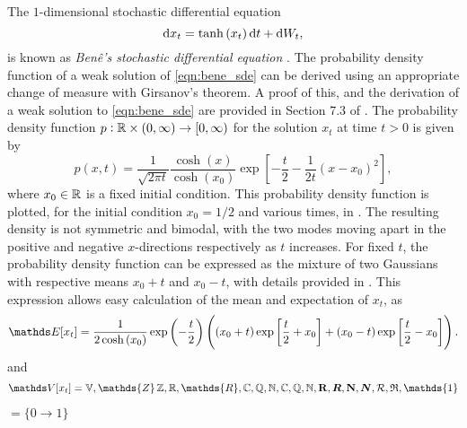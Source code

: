 \begin{example}
	The \(1\)-dimensional stochastic differential equation 
	\begin{equation}
		\sde{x_t}{\tanh\left(x_t\right)}{},
		\label{eqn:bene_sde}
	\end{equation}
	is known as \emph{Ben\^e's stochastic differential equation} \cite{SarkkaSolin_2019_AppliedStochasticDifferential}.
	The probability density function of a weak solution of \eqref{eqn:bene_sde} can be derived using an appropriate change of measure with Girsanov's theorem. 
	A proof of this, and the derivation of a weak solution to \eqref{eqn:bene_sde} are provided in Section 7.3 of \cite{SarkkaSolin_2019_AppliedStochasticDifferential}.
	The probability density function \(p: \mathbb{R} \times \left(0,\infty\right) \to \left[0,\infty\right)\) for the solution \(x_t\) at time \(t > 0\) is given by 
	\begin{equation}\label{eqn:bene_sde_pdf}
	p(x,t) = \frac{1}{\sqrt{2\pi t}}\frac{\cosh\left(x\right)}{\cosh\left(x_0\right)}\exp\left[-\frac{t}{2} - \frac{1}{2t}\left(x - x_0\right)^2\right],
\end{equation}
	where \(x_0 \in \mathbb{R}\) is a fixed initial condition.
	This probability density function is plotted, for the initial condition \(x_0 = 1/2\) and various times, in .
	The resulting density is not symmetric and bimodal, with the two modes moving apart in the positive and negative \(x\)-directions respectively as \(t\) increases.
	For fixed \(t\), the probability density function can be expressed as the mixture of two Gaussians with respective means \(x_0 + t\) and \(x_0 - t\), with details provided in .
	This expression allows easy calculation of the mean and expectation of \(x_t\), as 
	\[
		\avg{x_t} = \frac{1}{2\cosh\left(x_0\right)}\exp\left(-\frac{t}{2}\right)\left(\left(x_0 + t\right)\exp\left[\frac{t}{2} +x_0\right] + (x_0 - t)\exp\left[\frac{t}{2} - x_0\right]\right).
	\]
	and 
	\[
		\var{x_t} = \mathbb{V}, \mathds{Z} \,  \mathbb{Z}, \R, \mathds{R}, \mathbb{C}, \mathbb{Q}, \mathbb{N}, \C, \Q, \N, \mathbf{R}, \bm{R}, \mathbf{N}, \bm{N}, \mathcal{R}, \mathfrak{R}, \mathds{1}
	\]
\end{example}
 $= \{0 \to 1\}$ 

